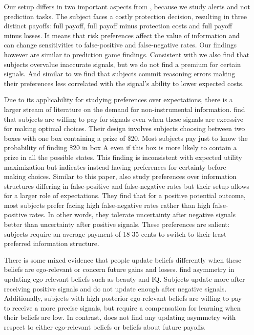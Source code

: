 \documentclass[12pt,a4paper]{article}
\begin{document}
Our setup differs in two important aspects from \citep*{ambuehl_belief_2018, xu_revealed_2022}, because we study alerts and not prediction tasks. The subject faces a costly protection decision, resulting in three distinct payoffs: full payoff, full payoff minus protection costs and full payoff minus losses. It means that risk preferences affect the value of information and can change sensitivities to false-positive and false-negative rates. Our findings however are similar to prediction game findings. Consistent with \citet{ambuehl_belief_2018} we also find that subjects overvalue inaccurate signals, but we do not find a premium for certain signals.  And similar to \citet{xu_revealed_2022} we find that subjects commit reasoning errors making their preferences less correlated with the signal's ability to lower expected costs.

Due to its applicability for studying preferences over expectations, there is a larger stream of literature on the demand for non-instrumental information. \citet{eliaz_paying_2010} find that subjects are willing to pay for signals even when these signals are excessive for making optimal choices. Their design involves subjects choosing between two boxes with one box containing a prize of \$20. Most subjects pay just to know the probability of finding \$20 in box A even if this box is more likely to contain a prize in all the possible states. This finding is inconsistent with expected utility maximization but indicates instead having preferences for certainty before making choices.  Similar to this paper, \citet{masatlioglu_intrinsic_2017} also study preferences over information structures differing in false-positive and false-negative rates but their setup allows for a larger role of expectations. They find that for a positive potential outcome, most subjects prefer facing high false-negative rates rather than high false-positive rates. In other words, they tolerate uncertainty after negative signals better than uncertainty after positive signals. These preferences are salient: subjects require an average payment of 18-35 cents to switch to their least preferred information structure.

There is some mixed evidence that people update beliefs differently when these beliefs are ego-relevant or concern future gains and losses. \citet{eil_good_2011} find asymmetry in updating ego-relevant beliefs such as beauty and IQ. Subjects update more after receiving positive signals and do not update enough after negative signals. Additionally, subjects with high posterior ego-relevant beliefs are willing to pay to receive a more precise signals, but require a compensation for learning when their beliefs are low. In contrast, \citet{coutts_good_2019} does not find any updating asymmetry with respect to either ego-relevant beliefs or beliefs about future payoffs. 
\end{document}
